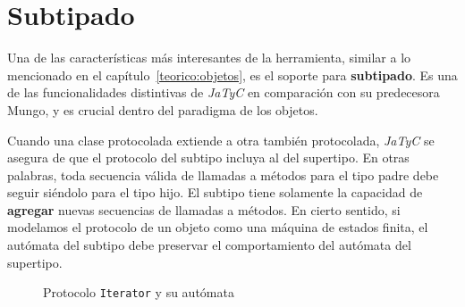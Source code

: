 \section{Subtipado}
\label{subtipado}

Una de las características más interesantes de la herramienta, similar a lo mencionado en el capítulo~\ref{teorico:objetos}, es el soporte para \textbf{subtipado}. Es una de las funcionalidades distintivas de \textit{JaTyC} en comparación con su predecesora Mungo, y es crucial dentro del paradigma de los objetos.

Cuando una clase protocolada extiende a otra también protocolada, \textit{JaTyC} se asegura de que el protocolo del subtipo incluya al del supertipo. En otras palabras, toda secuencia válida de llamadas a métodos para el tipo padre debe seguir siéndolo para el tipo hijo. El subtipo tiene solamente la capacidad de \textbf{agregar} nuevas secuencias de llamadas a métodos. En cierto sentido, si modelamos el protocolo de un objeto como una máquina de estados finita, el autómata del subtipo debe preservar el comportamiento del autómata del supertipo.

\begin{figure}[htbp]
\centering
\begin{minipage}[c]{0.50\textwidth}
    
\end{minipage}
\hfill
\begin{minipage}[c]{0.46\textwidth}
\centering
{}
\end{minipage}
\caption{Protocolo \texttt{Iterator} y su autómata}
\label{jatyc:iterator_protocol}
\end{figure}

